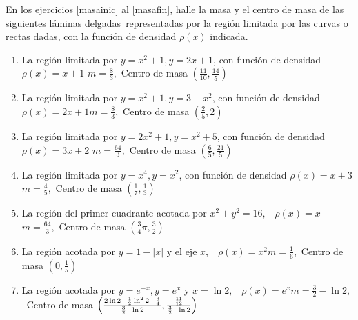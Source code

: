 

\begin{ejer}{En los ejercicios \eqref{masainic} al \eqref{masafin}, halle la masa y el centro de masa de las siguientes láminas delgadas\ representadas por la región limitada por las curvas o rectas dadas, con la función de densidad \textit{$\rho \left(x\right) $} indicada.}
\end{ejer}



{\small
\begin{enumerate}
	
\item {\label{masainic} La región limitada por $y=x^{2}+1,y=2x+1$, con función de densidad $\rho \left( x\right) =x+1$}
{$m=\frac{8}{3},$ Centro de masa $\left( \frac{11}{10},\frac{14}{5}\right) $}



\item {La región limitada por $y=x^{2}+1,y=3-x^{2}$, con función de
densidad $\rho \left( x\right) =2x+1$}{$m=\frac{8}{3},$ Centro de masa $\left( \frac{2}{5},2\right)$}



\item {La región limitada por $y=2x^{2}+1,y=x^{2}+5$, con función de
densidad $\rho \left( x\right) =3x+2$} {$m=\frac{64}{3},$ Centro de masa $\left( \frac{6}{5},\frac{21}{5}\right)$}



\item {La región limitada por $y=x^{4},y=x^{2}$, con función de densidad
$\rho \left( x\right) =x+3$}{$m=\frac{4}{5},$ Centro de masa $\left( \frac{1}{7},\frac{1}{3}%
\right)$}



\item {La región del primer cuadrante acotada por $x^{2}+y^{2}=16,$ \ $\rho
\left( x\right) =x$}{$m=\frac{64}{3},$ Centro de masa $\left( \frac{3}{4}\pi ,\frac{3}{2}%
\right)$}



\item {La región acotada por $y=1-\left\vert x\right\vert $ y el eje $x,$ \
$\rho \left( x\right) =x^{2}$}{$m=\frac{1}{6},$ Centro de masa $\left( 0,\frac{1}{5}\right)$}



\item {La región acotada por $y=e^{-x},y=e^{x}$ y $x=\ln 2,$ \ $\rho
\left( x\right) =e^{x}$}{$m=\frac{3}{2}-\ln 2,$ \ Centro de masa $\left( \frac{2\ln 2-\frac{1}{2}\ln ^{2}2-\frac{3}{4}}{%
\frac{3}{2}-\ln 2},\frac{\frac{11}{12}}{\frac{3}{2}-\ln 2}\right)$}




\end{enumerate}}
